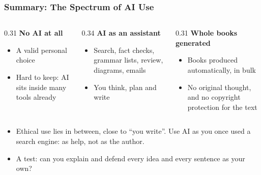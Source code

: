 \begin{frame}[fragile]\frametitle{Summary: The Spectrum of AI Use}
\begin{columns}
    \begin{column}[T]{0.31\linewidth}
    \textbf{No AI at all}
    \begin{itemize}
    \item A valid personal choice
    \item Hard to keep: AI sits inside many tools already
    \end{itemize}
    \end{column}
    \begin{column}[T]{0.34\linewidth}
    \textbf{AI as an assistant}
    \begin{itemize}
    \item Search, fact checks, grammar lists, review, diagrams, emails
    \item You think, plan and write
    \end{itemize}
    \end{column}
    \begin{column}[T]{0.31\linewidth}
    \textbf{Whole books generated}
    \begin{itemize}
    \item Books produced automatically, in bulk
    \item No original thought, and no copyright protection for the text
    \end{itemize}
    \end{column}
\end{columns}
\medskip
\begin{itemize}
\item Ethical use lies in between, close to ``you write''. Use AI as you once used a search engine: as help, not as the author.
\item A test: can you explain and defend every idea and every sentence as your own?
\end{itemize}
\end{frame}

